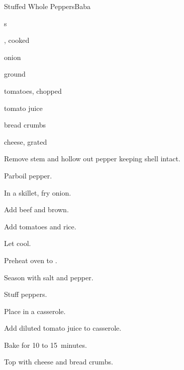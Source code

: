 \begin{recipe}{Stuffed Whole Peppers}{Baba}{}

\begin{ingredients}
\item {}s
\item {}, cooked
\item onion
\item ground 
\item tomatoes, chopped
\item tomato juice
\item bread crumbs
\item cheese, grated
\end{ingredients}

\begin{directions}
\item Remove stem and hollow out pepper keeping shell intact.
\item Parboil pepper.
\item In a skillet, fry onion.
\item Add beef and brown.
\item Add tomatoes and rice.
\item Let cool.
\item Preheat oven to .
\item Season with salt and pepper.
\item Stuff peppers.
\item Place in a casserole.
\item Add diluted tomato juice to casserole.
\item Bake for 10 to 15~minutes.
\item Top with cheese and bread crumbs.
\end{directions}

\end{recipe}
